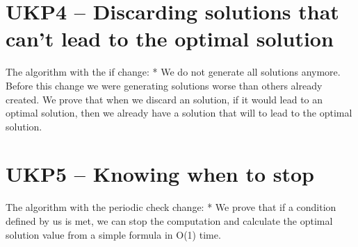 \documentclass[12pt]{article}
\begin{document}
\section{UKP4 -- Discarding solutions that can't lead to the optimal solution}
The algorithm with the if change:
	* We do not generate all solutions anymore. Before this change we were generating solutions worse than others already created. We prove that when we discard an solution, if it would lead to an optimal solution, then we already have a solution that will to lead to the optimal solution.

\section{UKP5 -- Knowing when to stop}
The algorithm with the periodic check change:
	* We prove that if a condition defined by us is met, we can stop the computation and calculate the optimal solution value from a simple formula in O(1) time.
\end{document}
